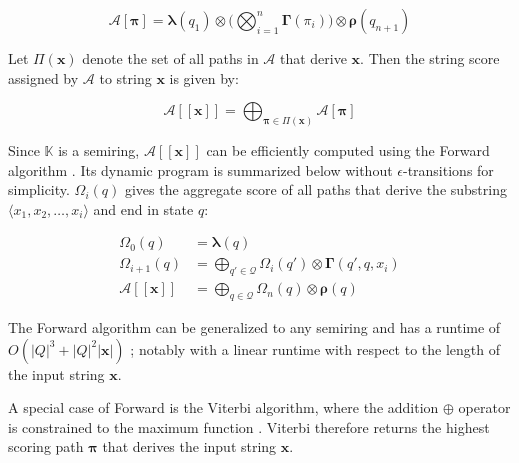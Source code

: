 \begin{equation}
  \mathcal{A}[\bm{\pi}] = \bm{\lambda}(q_1) \otimes \Bigg( \bigotimes_{i=1}^n \bm{\Gamma}(\pi_i) \Bigg) \otimes \bm{\rho}(q_{n+1})
\end{equation}

\begin{definition}
  \label{def:string_score}
  Let $\Pi(\bm{x})$ denote the set of all paths in $\mathcal{A}$ that derive
  $\bm{x}$. Then the string score assigned by $\mathcal{A}$ to string $\bm{x}$
  is given by:
  
\end{definition}

\begin{equation}
  \mathcal{A}[\![\bm{x}]\!] = \bigoplus_{\bm{\pi} \in \Pi(\bm{x})} \mathcal{A}[\bm{\pi}]
\end{equation}

\begin{remark}
  Since $\mathbb{K}$ is a semiring, $\mathcal{A}[\![\bm{x}]\!]$ can be
  efficiently computed using the Forward algorithm \citep{baum1966statistical}.
  Its dynamic program is summarized below without $\epsilon$-transitions for
  simplicity. $\Omega_i(q)$ gives the aggregate score of all paths that derive
  the substring $\langle x_1, x_2, \dots, x_i \rangle$ and end in state $q$:
 
  \begin{subequations}
    \begin{align}
      \Omega_0(q) &= \bm{\lambda}(q) \\
      \Omega_{i+1}(q) &= \bigoplus_{q' \in \mathcal{Q}} \Omega_i(q') \otimes \bm{\Gamma}(q',q,x_i)  \\
      \mathcal{A}[\![\bm{x}]\!] &= \bigoplus_{q \in \mathcal{Q}} \Omega_n(q) \otimes \bm{\rho}(q)
    \end{align}
  \end{subequations}

\end{remark}

\begin{remark}
  \label{rmk:old_runtime}
  The Forward algorithm can be generalized to any semiring
  \citep{eisner2002parameter} and has a runtime of $O(|Q|^3 + |Q|^2|\bm{x}|)$
  \citep{schwartz2018sopa}; notably with a linear runtime with respect to the
  length of the input string $\bm{x}$.
\end{remark}

\begin{remark}
  A special case of Forward is the Viterbi algorithm, where the addition
  $\oplus$ operator is constrained to the maximum function
  \citep{viterbi1967error}. Viterbi therefore returns the highest scoring path
  $\bm{\pi}$ that derives the input string $\bm{x}$.
\end{remark}

